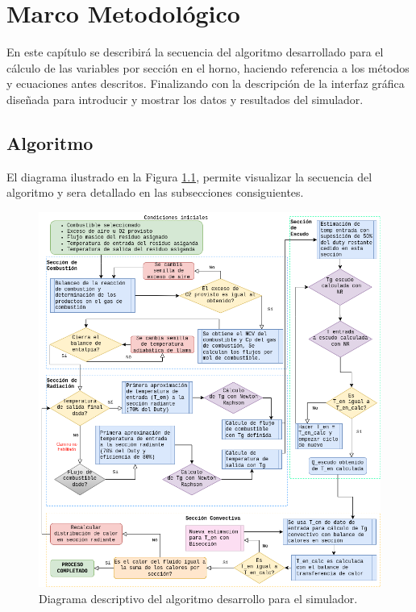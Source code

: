 \chapter{Marco Metodológico}

\par En este capítulo se describirá la secuencia del algoritmo desarrollado para el cálculo de las variables por sección en el horno, haciendo referencia a los métodos y ecuaciones antes descritos. Finalizando con la descripción de la interfaz gráfica diseñada para introducir y mostrar los datos y resultados del simulador.

\section{Algoritmo}

\par El diagrama ilustrado en la Figura \ref{fig:diagrama-algo}, permite visualizar la secuencia del algoritmo y sera detallado en las subsecciones consiguientes.

\begin{figure}[hbt]
\begin{center}
\includegraphics[scale=0.45]{images/diagrama-algo}
\caption[Diagrama de algoritmo]{Diagrama descriptivo del algoritmo desarrollo para el simulador.}
\label{fig:diagrama-algo}
\end{center}
\end{figure}

